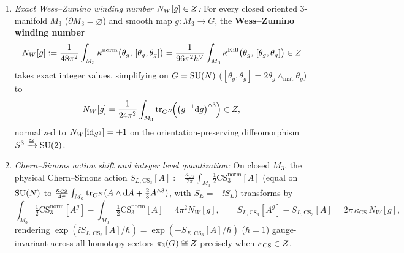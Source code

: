 \begin{proposition}
\begin{enumerate}[label=(\arabic*),leftmargin=*]
  \item \emph{Exact Wess--Zumino winding number $N_W[g] \in Z$:} For every closed oriented $3$-manifold $M_3$ ($\partial M_3 = \varnothing$) and smooth map $g : M_3 \to G$, the \textbf{Wess--Zumino winding number}
  \begin{equation}
  \label{eq:exact-NW-formula}
  N_W[g] := \frac{1}{48\pi^2}\int_{M_3}\kappa^{\mathrm{norm}}\bigl(\theta_g,\, [\theta_g, \theta_g]\bigr) = \frac{1}{96\pi^2 h^\vee}\int_{M_3}\kappa^{\mathrm{Kill}}\bigl(\theta_g,\, [\theta_g, \theta_g]\bigr) \in Z
  \end{equation}
  takes exact integer values, simplifying on $G = \operatorname{SU}(N)$ ($[\theta_g,\theta_g] = 2\theta_g\wedge_{\mathrm{mat}}\theta_g$) to
  \begin{equation}
  \label{eq:exact-NW-suN}
  N_W[g] = \frac{1}{24\pi^2}\int_{M_3}\operatorname{tr}_{C^N}\!\Bigl(\bigl(g^{-1}\mathrm{d} g\bigr)^{\wedge 3}\Bigr) \in Z,
  \end{equation}
  normalized to $N_W[\operatorname{id}_{S^3}] = +1$ on the orientation-preserving diffeomorphism $S^3 \xrightarrow{\cong} \operatorname{SU}(2)$.

  \item \emph{Chern--Simons action shift and integer level quantization:} On closed $M_3$, the physical Chern--Simons action $S_{L,\mathrm{CS}_3}[A] := \frac{\kappa_{\mathrm{CS}}}{2\pi}\int_{M_3}\frac{1}{2}\mathrm{CS}_3^{\mathrm{norm}}[A]$ (equal on $\operatorname{SU}(N)$ to $\frac{\kappa_{\mathrm{CS}}}{4\pi}\int_{M_3}\operatorname{tr}_{C^N}(A\wedge\mathrm{d} A + \frac{2}{3}A^{\wedge 3})$, with $S_E = -\ii S_L$) transforms by
  \begin{equation}
  \label{eq:cs3-action-shift-quant}
  \int_{M_3}\tfrac{1}{2}\mathrm{CS}_3^{\mathrm{norm}}[A^g] - \int_{M_3}\tfrac{1}{2}\mathrm{CS}_3^{\mathrm{norm}}[A] = 4\pi^2 N_W[g],\qquad
  S_{L,\mathrm{CS}_3}[A^g] - S_{L,\mathrm{CS}_3}[A] = 2\pi\,\kappa_{\mathrm{CS}}\,N_W[g],
  \end{equation}
  rendering $\exp(\ii S_{L,\mathrm{CS}_3}[A]/\hbar) = \exp(-S_{E,\mathrm{CS}_3}[A]/\hbar)$ ($\hbar = 1$) gauge-invariant across all homotopy sectors $\pi_3(G) \cong Z$ precisely when $\kappa_{\mathrm{CS}} \in Z$.
\end{enumerate}
\end{proposition}

